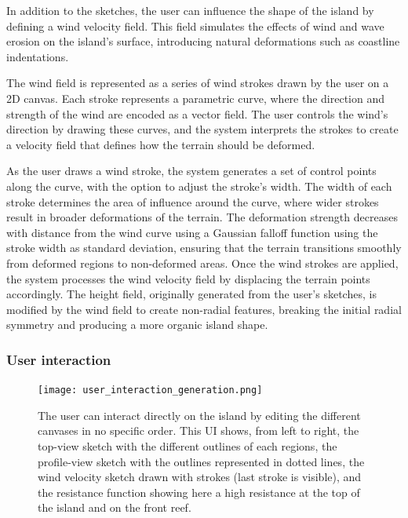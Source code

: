In addition to the sketches, the user can influence the shape of the island by defining a wind velocity field. This field simulates the effects of wind and wave erosion on the island's surface, introducing natural deformations such as coastline indentations.

The wind field is represented as a series of wind strokes drawn by the user on a 2D canvas. Each stroke represents a parametric curve, where the direction and strength of the wind are encoded as a vector field. The user controls the wind's direction by drawing these curves, and the system interprets the strokes to create a velocity field that defines how the terrain should be deformed.

As the user draws a wind stroke, the system generates a set of control points along the curve, with the option to adjust the stroke's width. The width of each stroke determines the area of influence around the curve, where wider strokes result in broader deformations of the terrain.
The deformation strength decreases with distance from the wind curve using a Gaussian falloff function using the stroke width as standard deviation, ensuring that the terrain transitions smoothly from deformed regions to non-deformed areas.
Once the wind strokes are applied, the system processes the wind velocity field by displacing the terrain points accordingly. The height field, originally generated from the user's sketches, is modified by the wind field to create non-radial features, breaking the initial radial symmetry and producing a more organic island shape.

\subsubsection{User interaction}

\begin{figure}[H]
    \centering
    \texttt{[image: user\_interaction\_generation.png]}
    \caption{The user can interact directly on the island by editing the different canvases in no specific order. This UI shows, from left to right, the top-view sketch with the different outlines of each regions, the profile-view sketch with the outlines represented in dotted lines, the wind velocity sketch drawn with strokes (last stroke is visible), and the resistance function showing here a high resistance at the top of the island and on the front reef.}
    \label{fig:coral-island_wind-from-strokes-interaction}
\end{figure}

